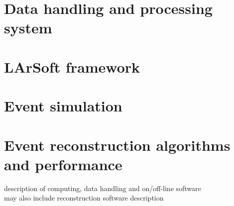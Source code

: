 
\section{Data handling and processing system}

\section{LArSoft framework}

\section{Event simulation}

\section{Event reconstruction algorithms and performance}

description of computing, data handling and on/off-line software\\

may also include reconstruction software description

